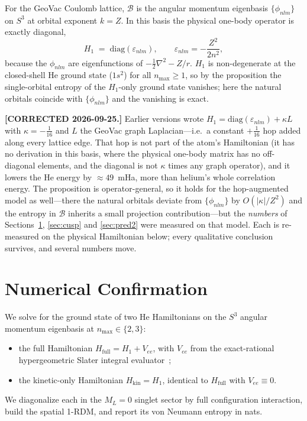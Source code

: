 \documentclass[twocolumn,pra,amsmath,amssymb,superscriptaddress]{revtex4-2}
\begin{document}
For the GeoVac Coulomb lattice, $\mathcal{B}$ is the angular
momentum eigenbasis $\{\phi_{nlm}\}$ on $S^{3}$ at orbital exponent
$k = Z$.  In this basis the physical one-body operator is exactly
diagonal,
\begin{equation}
  H_1 \;=\; \mathrm{diag}(\varepsilon_{nlm}),
  \qquad \varepsilon_{nlm} = -\frac{Z^{2}}{2n^{2}},
  \label{eq:h1_geovac}
\end{equation}
because the $\phi_{nlm}$ are eigenfunctions of
$-\tfrac12\nabla^2 - Z/r$.  $H_1$ is non-degenerate at the closed-shell
He ground state ($1s^2$) for all $n_{\max}\geq 1$, so by the
proposition the single-orbital entropy of the $H_1$-only ground state
vanishes; here the natural orbitals coincide with $\{\phi_{nlm}\}$ and
the vanishing is exact.

\textbf{[CORRECTED 2026-09-25.]}  Earlier versions wrote
$H_1 = \mathrm{diag}(\varepsilon_{nlm}) + \kappa L$ with
$\kappa = -\tfrac{1}{16}$ and $L$ the GeoVac graph Laplacian---i.e.\ a
constant $+\tfrac{1}{16}$ hop added along every lattice edge.  That hop
is not part of the atom's Hamiltonian (it has no derivation in this
basis, where the physical one-body matrix has no off-diagonal
elements, and the diagonal is not $\kappa$ times any graph operator),
and it lowers the He energy by $\approx 49$~mHa, more than helium's
whole correlation energy.  The proposition is operator-general, so it
holds for the hop-augmented model as well---there the natural orbitals
deviate from $\{\phi_{nlm}\}$ by $O(|\kappa|/Z^{2})$ and the entropy
in $\mathcal{B}$ inherits a small projection contribution---but the
\emph{numbers} of Sections~\ref{sec:numerical}, \ref{sec:cusp} and
\ref{sec:pred2} were measured on that model.  Each is re-measured on
the physical Hamiltonian below; every qualitative conclusion survives,
and several numbers move.

\section{Numerical Confirmation}
\label{sec:numerical}

We solve for the ground state of two He Hamiltonians on the
$S^{3}$ angular momentum eigenbasis at $n_{\max}\in\{2,3\}$:
\begin{itemize}
  \item the full Hamiltonian
  $H_{\mathrm{full}} = H_1 + V_{ee}$, with $V_{ee}$ from the
  exact-rational hypergeometric Slater integral
  evaluator~\cite{GeoVac_Paper7,EP1_data};
  \item the kinetic-only Hamiltonian
  $H_{\mathrm{kin}} = H_1$, identical to $H_{\mathrm{full}}$
  with $V_{ee}\equiv 0$.
\end{itemize}
We diagonalize each in the $M_L=0$ singlet sector by full
configuration interaction, build the spatial 1-RDM, and report
its von Neumann entropy in nats.
\end{document}
